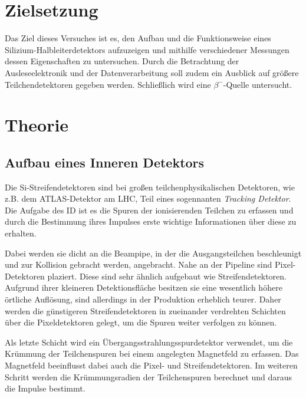 \section{Zielsetzung}
\label{sec:Zielsetzung}

Das Ziel dieses Versuches ist es, den Aufbau und die Funktionsweise eines
Silizium-Halbleiterdetektors aufzuzeigen und mithilfe verschiedener Messungen dessen
Eigenschaften zu untersuchen. Durch die Betrachtung der Ausleseelektronik und
der Datenverarbeitung soll zudem ein Ausblick auf größere Teilchendetektoren
gegeben werden. Schließlich wird eine $\beta^{-}$-Quelle untersucht.

\section{Theorie}
\label{sec:Theorie}
\subsection{Aufbau eines Inneren Detektors}

Die Si-Streifendetektoren sind bei großen teilchenphysikalischen Detektoren,
wie z.B. dem ATLAS-Detektor am LHC, Teil eines sogennanten \textit{Tracking Detektor}.
Die Aufgabe des ID ist es die Spuren der ionisierenden Teilchen zu erfassen und
durch die Bestimmung ihres Impulses erste wichtige Informationen über diese zu
erhalten.

Dabei werden sie dicht an die Beampipe, in der die Ausgangsteilchen beschleunigt und
zur Kollision gebracht werden, angebracht. Nahe an der Pipeline sind Pixel-Detektoren plaziert.
Diese sind sehr ähnlich aufgebaut wie Streifendetektoren. Aufgrund ihrer kleineren
Detektionsfläche besitzen sie eine wesentlich höhere örtliche Auflösung, sind
allerdings in der Produktion erheblich teurer. Daher werden die günstigeren
Streifendetektoren in zueinander verdrehten Schichten über die Pixeldetektoren
gelegt, um die Spuren weiter verfolgen zu können.

Als letzte Schicht wird ein Übergangsstrahlungsspurdetektor verwendet, um die
Krümmung der Teilchenspuren bei einem angelegten Magnetfeld zu
erfassen. Das Magnetfeld beeinflusst dabei auch die Pixel- und Streifendetektoren.
Im weiteren Schritt werden die Krümmungsradien der Teilchenspuren
berechnet und daraus die Impulse bestimmt.

